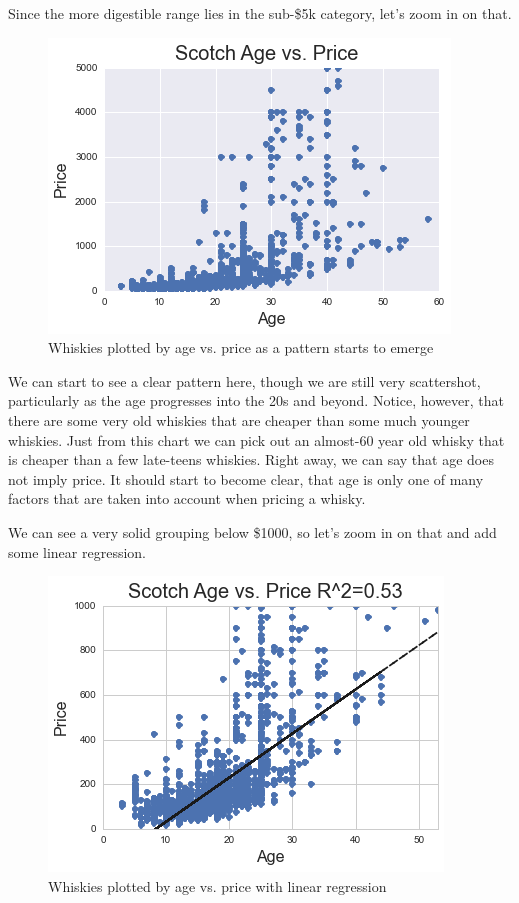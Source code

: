 Since the more digestible range lies in the sub-\$5k category, let's zoom in on that.

\begin{figure}[htb]
\centering
\includegraphics[scale=1]{age_vs_price2}
\caption{Whiskies plotted by age vs. price as a pattern starts to emerge}
\label{fig:age_vs_price2} 
\end{figure}

We can start to see a clear pattern here, though we are still very scattershot, particularly as the age progresses into the 20s and beyond. Notice, however, that there are some very old whiskies that are cheaper than some much younger whiskies. Just from this chart we can pick out an almost-60 year old whisky that is cheaper than a few late-teens whiskies. Right away, we can say that age does not imply price. It should start to become clear, that age is only one of many factors that are taken into account when pricing a whisky.

\pagebreak

We can see a very solid grouping below \$1000, so let's zoom in on that and add some linear regression.

\begin{figure}[htb]
\centering
\includegraphics[scale=1]{age_vs_price3} 
\caption{Whiskies plotted by age vs. price with linear regression}
\label{fig:age_vs_price3} 
\end{figure}

